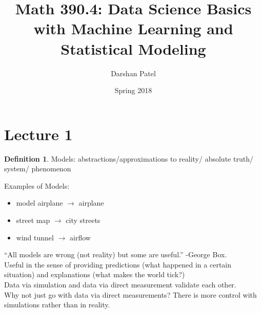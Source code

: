 \documentclass[12pt]{article}
\begin{document}
\theoremstyle{definition}
\newtheorem{theorem}{Theorem}[section]
\newtheorem{definition}{Definition}[section]
\newtheorem{example}{Example}[section]

\newcommand{\set}[1]{\left\{ #1 \right\}}
\newcommand{\indicator}[1]{\mathds{1}_{#1}}
\newcommand{\argmin}[1]{\stackrel{\text{argmin}}{ #1 }}
\newcommand{\expe}[1]{\mathrm{E}[ #1 ]}
\renewcommand{\var}[1]{\mathrm{Var}[ #1 ]}
\newcommand{\prob}[1]{\mathbb{P}(#1)}
\newcommand{\cprob}[2]{\prob{#1~|~#2}}
\newcommand{\cov}[1]{\mathrm{Cov}[ #1 ]}
\newcommand{\corr}[1]{\mathrm{Corr}[ #1 ]}
\newcommand{\se}[1]{\mathrm{SE}[ #1 ]}
\newcommand{\reals}[1]{\mathbb{R}^{ #1 }}
\newcommand{\proj}[2]{\text{proj}_{ #1 } ( #2 )}
\newcommand{\projva}{\proj{\vec{v}}{\vec{a}}}
\newcommand{\colsp}[1]{\mathrm{colsp}\set{#1}}
\newcommand{\vhat}[1]{\vec{\hat{#1}}}
\newcommand{\nvec}[2]{\norm{\vec{#1}}^{#2}}
\newcommand{\vnorm}[1]{\norm{\vec{#1}}}
\renewcommand{\argmin}[1]{\stackrel{\text{argmin}}{#1}}
\newcommand{\argmax}[1]{\stackrel{\text{argmax}}{#1}}


\title{Math 390.4: Data Science Basics with Machine Learning and Statistical Modeling}
\author{Darshan Patel}
\date{Spring 2018}
\maketitle

\tableofcontents

\section{Lecture 1} 

\begin{definition} Models: abstractions/approximations to reality/ absolute truth/ system/ phenomenon \end{definition} 

Examples of Models: \begin{itemize} 
\item model airplane $\to$ airplane 
\item street map $\to$ city streets 
\item wind tunnel $\to$ airflow \end{itemize} 

``All models are wrong (not reality) but some are useful.'' -George Box. \\
Useful in the sense of providing predictions (what happened in a certain situation) and explanations (what makes the world tick?) \\
Data via simulation and data via direct measurement validate each other. \\
Why not just go with data via direct measurements? There is more control with simulations rather than in reality. 
\end{document}
